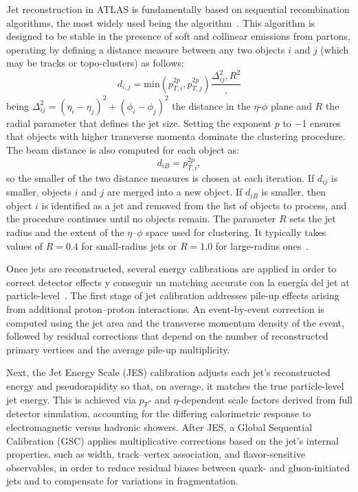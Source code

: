 Jet reconstruction in ATLAS is fundamentally based on sequential recombination algorithms, the most widely used being the \antikt algorithm~\cite{Cacciari_2008}. This algorithm is designed to be stable in the presence of soft and collinear emissions from partons, operating by defining a distance measure between any two objects $i$ and $j$ (which may be tracks or topo-clusters) as follows:
\begin{equation}
  d_{i,j} = \text{min}(p^{2p}_{T,i},p^{2p}_{T,j})\frac{\Delta^{2}_{ij},R^{2}},
\end{equation}
being $\Delta^{2}_{ij} = (\eta_{i} - \eta_{j})^2 + (\phi_{i} - \phi_{j})^2$ the distance in the $\eta$-$\phi$ plane and $R$ the radial parameter that defines the jet size. Setting the exponent $p$ to −1 ensures that objects with higher transverse momenta dominate the clustering procedure. The beam distance is also computed for each object as:
\begin{equation}
  d_{iB} = p^{2p}_{T,i},
\end{equation}
so the smaller of the two distance measures is chosen at each iteration. If \(d_{ij}\) is smaller, objects \(i\) and \(j\) are merged into a new object. If \(d_{iB}\) is smaller, then object \(i\) is identified as a jet and removed from the list of objects to process, and the procedure continues until no objects remain. The parameter \(R\) sets the jet radius and the extent of the \(\eta\)–\(\phi\) space used for clustering. It typically takes values of \(R = 0.4\) for small-radius jets or \(R = 1.0\) for large-radius ones~\cite{jets_cluster}.

Once jets are reconstructed, several energy calibrations are applied in order to correct detector effects y conseguir un matching accurate con la energía del jet at particle-level~\cite{jets_calib}. The first stage of jet calibration addresses pile-up effects arising from additional proton–proton interactions. An event-by-event correction is computed using the jet area and the transverse momentum density of the event, followed by residual corrections that depend on the number of reconstructed primary vertices and the average pile-up multiplicity. 

Next, the Jet Energy Scale (JES) calibration adjusts each jet’s reconstructed energy and pseudorapidity so that, on average, it matches the true particle-level jet energy. This is achieved via $p_{T}$- and $\eta$-dependent scale factors derived from full detector simulation, accounting for the differing calorimetric response to electromagnetic versus hadronic showers. After JES, a Global Sequential Calibration (GSC) applies multiplicative corrections based on the jet’s internal properties, such as width, track–vertex association, and flavor-sensitive observables, in order to reduce residual biases between quark- and gluon-initiated jets and to compensate for variations in fragmentation.

